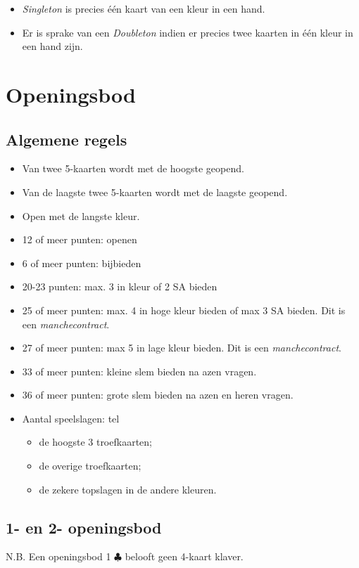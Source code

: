 \documentclass[12pt,a4paper]{report}
\begin{document}
\begin{itemize}
	\item \emph{Singleton} is precies \'e\'en kaart van een kleur in een hand.
	\item Er is sprake van een \emph{Doubleton} indien er precies twee kaarten in \'e\'en kleur in een hand zijn.
\end{itemize}



\chapter{Openingsbod}
\section{Algemene regels}
\begin{itemize}
	\item Van twee 5-kaarten wordt met de hoogste geopend.
	\item Van de laagste twee 5-kaarten wordt met de laagste geopend.
	\item Open met de langste kleur.
	
	\item 12 of meer punten: openen
	\item 6 of meer punten: bijbieden
	\item 20-23 punten: max. 3 in kleur of 2 SA bieden
	\item 25 of meer punten: max. 4 in hoge kleur bieden of
	      max 3 SA bieden. Dit is een \emph{manchecontract}.
	\item 27 of meer punten: max 5 in lage kleur bieden. Dit is een \emph{manchecontract}.
	\item 33 of meer punten: kleine slem bieden na azen vragen.
	\item 36 of meer punten: grote slem bieden na azen en heren vragen. 
	
	
	
	\item Aantal speelslagen: tel
	\begin{itemize}
		\item de hoogste 3 troefkaarten;
		\item de overige troefkaarten;
		\item de zekere topslagen in de andere kleuren.
	\end{itemize}
\end{itemize}

\section{1- en 2- openingsbod}
N.B. Een openingsbod 1 $\clubsuit$ belooft geen 4-kaart klaver.
\\
\end{document}
